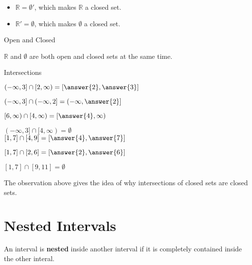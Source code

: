 \documentclass{ximera}
\begin{document}
\begin{itemize}
\item $\mathbb{R} = \emptyset'$, which makes $\mathbb{R}$ a closed set.
\item $\mathbb{R}' = \emptyset$, which makes $\emptyset$ a closed set.
\end{itemize}





\begin{fact} Open and Closed

$\mathbb{R}$ and $\emptyset$ are both open and closed sets at the same time.


\end{fact}






\begin{observation} Intersections

$(-\infty, 3] \cap  [2, \infty) = \left[\answer{2}, \answer{3}\right]$

$(-\infty, 3] \cap  (-\infty, 2] = \left(-\infty, \answer{2}\right]$

$[6, \infty)  \cap  [4, \infty) = \left[\answer{4}, \infty\right)$

$(-\infty, 3] \cap  [4, \infty) = \emptyset$ \\






$[1, 7] \cap  [4, 9] = \left[\answer{4}, \answer{7}\right]$

$[1, 7] \cap  [2, 6] = \left[\answer{2}, \answer{6}\right]$

$[1, 7] \cap  [9, 11] = \emptyset$


\end{observation}


The observation above gives the idea of why intersections of closed sets are closed sets.
















\section{Nested Intervals}


An interval is \textbf{nested} inside another interval if it is completely contained inside the other interal.
\end{document}
